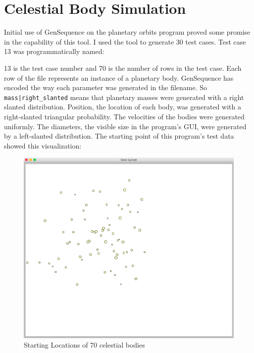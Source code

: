 \section{Celestial Body Simulation}
Initial use of GenSequence on the planetary orbits program proved some promise in the capability of this tool. I used the tool to generate 30 test cases. Test case 13 was programmatically named:
\vspace{1cm}

\noindent{}

\vspace{1cm}
13 is the test case number and 70 is the number of rows in the test case. Each row of the file represents an instance of a planetary body. GenSequence has encoded the way each parameter was generated in the filename. So \texttt{mass|right_slanted} means that planetary masses were generated with a right slanted distribution. Position, the location of each body, was generated with a right-slanted triangular probability. The velocities of the bodies were generated uniformly. The diameters, the visible size in the program's GUI, were generated by a left-slanted distribution. The starting point of this program's test data showed this visualization:

\begin{figure}[H]
\centering
\includegraphics[scale=0.4]{start-ex.png}
\caption{Starting Locations of 70 celestial bodies}
\label{fig:startbody}
\end{figure}

